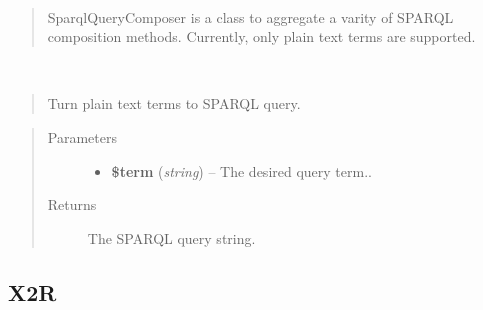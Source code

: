 \documentclass[letterpaper,10pt,english]{sphinxmanual}
\begin{document}
\begin{fulllineitems}
\label{docs/api:SparqlQueryComposer}~\begin{quote}

SparqlQueryComposer is a class to aggregate a varity of SPARQL composition methods. Currently, only plain text terms are supported.
\end{quote}

\begin{fulllineitems}
\label{docs/api:SparqlQueryComposer::term2Sparql}~\begin{quote}

Turn plain text terms to SPARQL query.
\end{quote}
\begin{quote}\begin{description}
\item[{Parameters}] \leavevmode\begin{itemize}
\item {} 
\textbf{\$term} (\emph{string}) -- The desired query term..

\end{itemize}

\item[{Returns}] \leavevmode
The SPARQL query string.

\end{description}\end{quote}

\end{fulllineitems}


\end{fulllineitems}



\subsection{X2R}
\label{docs/api:x2r}
\end{document}
